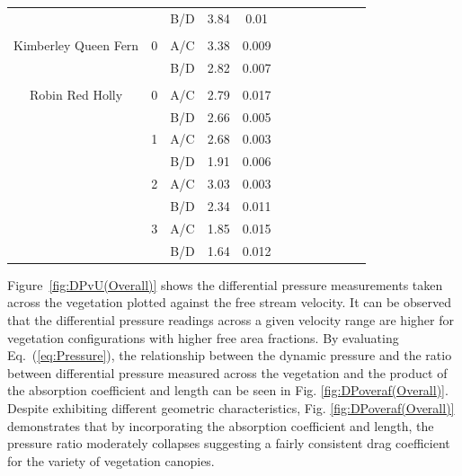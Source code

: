 \documentclass[12pt]{article}
\begin{document}
\begin{table}
\begin{tabular}{cccccccccccc}
	&		& 	B/D	&	3.84	&	0.01	&	\\	
			& 		&		&		&	\\	
Kimberley Queen Fern	&	0	& 	A/C	&	3.38	&	0.009	&	\\	
	&		& 	B/D	&	2.82	&	0.007	&	\\	
	&		&		&		&		&	\\		
Robin Red Holly	&	0	&	A/C	&	2.79	&	0.017	&	\\	
	&		&	B/D	&	2.66	&	0.005	&	\\	
	&	1	& 	A/C	&	2.68	&	0.003	&	\\	
	&		& 	B/D	&	1.91	&	0.006	&	\\	
	&	2	& 	A/C	&	3.03	&	0.003	&	\\	
	&		& 	B/D	&	2.34	&	0.011	&	\\	
	&	3	& 	A/C	&	1.85	&	0.015	&	\\	
	&		& 	B/D	&	1.64	&	0.012	&	\\	

		\hline
	\end{tabular}

\end{table}

Figure~\ref{fig:DPvU(Overall)} shows the differential pressure measurements taken across the vegetation plotted against the free stream velocity. It can be observed that the differential pressure readings across a given velocity range are higher for vegetation configurations with higher free area fractions. By evaluating Eq.~(\ref{eq:Pressure}), the relationship between the dynamic pressure and the ratio between differential pressure measured across the vegetation and the product of the absorption coefficient and length can be seen in Fig. \ref{fig:DPoveraf(Overall)}. Despite exhibiting different geometric characteristics, Fig. \ref{fig:DPoveraf(Overall)} demonstrates that by incorporating the absorption coefficient and length, the pressure ratio moderately collapses suggesting a fairly consistent drag coefficient for the variety of vegetation canopies.
\end{document}
